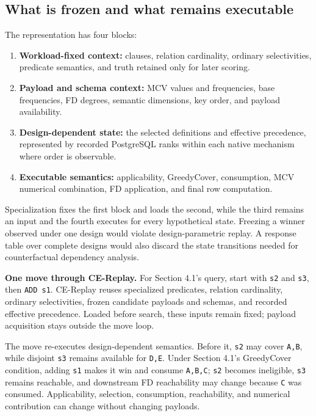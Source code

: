 \documentclass[sigconf,nonacm]{acmart}
\begin{document}
\subsection{What is frozen and what remains executable}

The representation has four blocks:

\begin{enumerate}
\item \textbf{Workload-fixed context:} clauses, relation cardinality, ordinary selectivities, predicate semantics, and truth retained only for later scoring.
\item \textbf{Payload and schema context:} MCV values and frequencies, base frequencies, FD degrees, semantic dimensions, key order, and payload availability.
\item \textbf{Design-dependent state:} the selected definitions and effective precedence, represented by recorded PostgreSQL ranks within each native mechanism where order is observable.
\item \textbf{Executable semantics:} applicability, GreedyCover, consumption, MCV numerical combination, FD application, and final row computation.
\end{enumerate}
Specialization fixes the first block and loads the second, while the third remains an input and the fourth executes for every hypothetical state. Freezing a winner observed under one design would violate design-parametric replay. A response table over complete designs would also discard the state transitions needed for counterfactual dependency analysis.

\textbf{One move through CE-Replay.} For Section 4.1's query, start with \texttt{s2} and \texttt{s3}, then \texttt{ADD s1}. CE-Replay reuses specialized predicates, relation cardinality, ordinary selectivities, frozen candidate payloads and schemas, and recorded effective precedence. Loaded before search, these inputs remain fixed; payload acquisition stays outside the move loop.

The move re-executes design-dependent semantics. Before it, \texttt{s2} may cover \texttt{A,B}, while disjoint \texttt{s3} remains available for \texttt{D,E}. Under Section 4.1's GreedyCover condition, adding \texttt{s1} makes it win and consume \texttt{A,B,C}; \texttt{s2} becomes ineligible, \texttt{s3} remains reachable, and downstream FD reachability may change because \texttt{C} was consumed. Applicability, selection, consumption, reachability, and numerical contribution can change without changing payloads.
\end{document}
